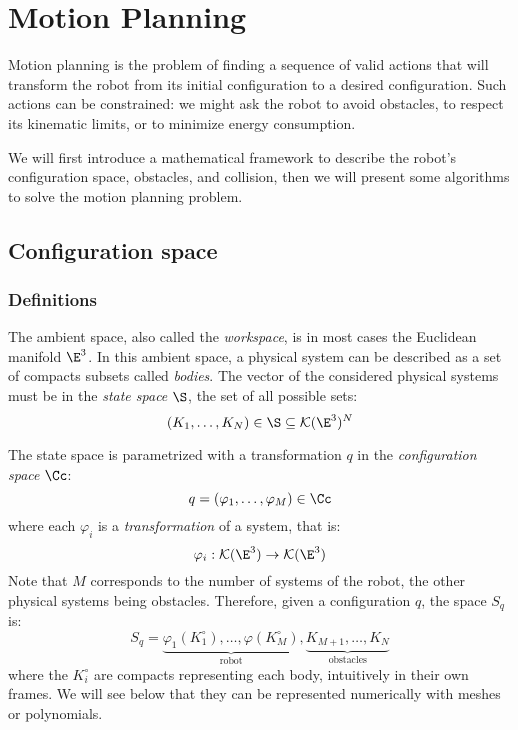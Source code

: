 \section{Motion Planning}
Motion planning is the problem of finding a sequence of valid actions that will transform the robot from its initial configuration to a desired configuration. Such actions can be constrained: we might ask the robot to avoid obstacles, to respect its kinematic limits, or to minimize energy consumption. 

We will first introduce a mathematical framework to describe the robot's configuration space, obstacles, and collision, then we will present some algorithms to solve the motion planning problem.

\subsection{Configuration space}
\subsubsection{Definitions}
The ambient space, also called the \emph{workspace}, is in most cases the Euclidean manifold $\E^3$. In this ambient space, a physical system can be described as a set of compacts subsets called \emph{bodies}. The vector of the considered physical systems must be in the \emph{state space} $\S$, the set of all possible sets:
\begin{equation*}
    (K_1, \dots, K_N) \in\S \subseteq \mathcal{K}(\E^3)^N
\end{equation*}

The state space is parametrized with a transformation $q$ in the \emph{configuration space} $\Cc$:
\begin{equation*}
    q = (\varphi_1, \dots, \varphi_M)\in\Cc
\end{equation*}
where each $\varphi_i$ is a \emph{transformation} of a system, that is:
\begin{equation*}
    \varphi_i: \mathcal{K}(\E^3) \to \mathcal{K}(\E^3)
\end{equation*}
Note that $M$ corresponds to the number of systems of the robot, the other physical systems being obstacles. Therefore, given a configuration $q$, the space $S_q$ is:
\begin{equation*}
    S_q = \underbrace{\varphi_1(K_1^\circ), \dots, \varphi(K_M^\circ)}_{\text{robot}}, \underbrace{K_{M+1}, \dots, K_N}_{\text{obstacles}}
\end{equation*}
where the $K_i^\circ$ are compacts representing each body, intuitively in their own frames. We will see below that they can be represented numerically with meshes or polynomials.

